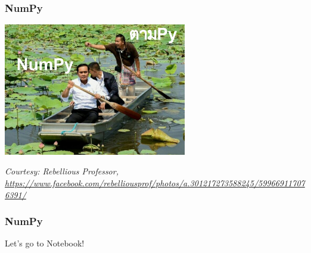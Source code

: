 \documentclass[aspectratio=169]{beamer}
\begin{document}
\begin{frame}
    \frametitle{NumPy}

    \centering
    \includegraphics[width=0.6\textwidth]{images/numpy-meme.jpg}

    {\scriptsize \textit{Courtesy: Rebellious Professor, \url{https://www.facebook.com/rebelliousprof/photos/a.301217273588245/599669117076391/}}}
\end{frame}

\begin{frame}
    \frametitle{NumPy}
    \centering
    { \Huge Let's go to Notebook! }
\end{frame}
\end{document}

